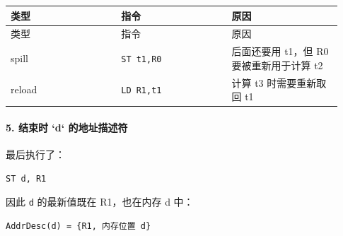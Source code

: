 \documentclass[UTF8]{ctexart}
\begin{document}
\begin{longtable}{|p{0.31\linewidth}|p{0.31\linewidth}|p{0.31\linewidth}|}
\hline
类型 & 指令 & 原因 \\
\hline
\endfirsthead
类型 & 指令 & 原因 \\
\hline
\endhead
spill & \texttt{ST t1,R0} & 后面还要用 t1，但 R0 要被重新用于计算 t2 \\
\hline
reload & \texttt{LD R1,t1} & 计算 t3 时需要重新取回 t1 \\
\hline
\end{longtable}

\paragraph*{5. 结束时 `d` 的地址描述符}

最后执行了：

\begin{Verbatim}[fontsize=\small,breaklines=true]
ST d, R1
\end{Verbatim}

因此 \texttt{d} 的最新值既在 R1，也在内存 d 中：

\begin{Verbatim}[fontsize=\small,breaklines=true]
AddrDesc(d) = {R1, 内存位置 d}
\end{Verbatim}
\end{document}
